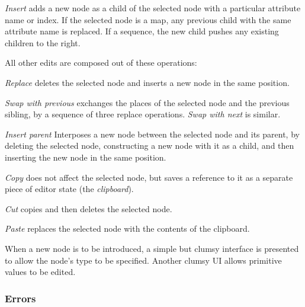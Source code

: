 \emph{Insert} adds a new node as a child of the selected node with a particular attribute name or index. If the selected node is a map, any previous child with the same attribute name is replaced. If a sequence, the new child pushes any existing children to the right.

All other edits are composed out of these operations:

\emph{Replace} deletes the selected node and inserts a new node in the same position.

\emph{Swap with previous} exchanges the places of the selected node and the previous sibling, by a sequence of three replace operations. \emph{Swap with next} is similar.

\emph{Insert parent} Interposes a new node between the selected node and its parent, by deleting the selected node, constructing a new node with it as a child, and then inserting the new node in the same position.



\emph{Copy} does not affect the selected node, but saves a reference to it as a separate piece of editor state (the \emph{clipboard}).

\emph{Cut} copies and then deletes the selected node.

\emph{Paste} replaces the selected node with the contents of the clipboard.

When a new node is to be introduced, a simple but clumsy interface is presented to allow the node's type to be specified. Another clumsy UI allows primitive values to be edited.


\subsubsection{Errors \todo{}}

